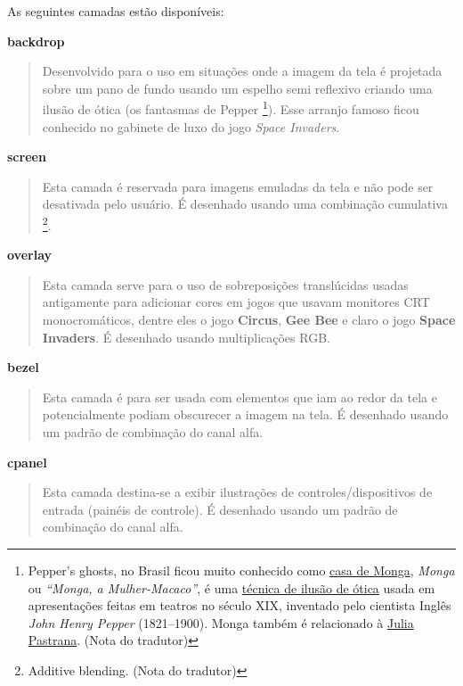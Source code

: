 \documentclass[letterpaper,10pt,brazil]{sphinxmanual}
\begin{document}
As seguintes camadas estão disponíveis:

\textbf{backdrop}
\begin{quote}

Desenvolvido para o uso em situações onde a imagem da tela é projetada
sobre um pano de fundo usando um espelho semi reflexivo criando uma
ilusão de ótica (os fantasmas de Pepper \footnote[5]{\sphinxAtStartFootnote%
Pepper's ghosts, no Brasil ficou muito
conhecido como \href{https://www.youtube.com/watch?v=L5Lgn1vbeHA}{casa de Monga},
\emph{Monga} ou \emph{``Monga, a Mulher-Macaco''}, é uma \href{https://www.youtube.com/watch?v=xrAWgmfhOaM}{técnica de ilusão
de ótica} usada
em apresentações feitas em teatros no século XIX, inventado pelo
cientista Inglês \emph{John Henry Pepper} (1821–1900). Monga também é
relacionado à
\href{https://super.abril.com.br/ciencia/monga-a-verdadeira-mulher-macaco/}{Julia Pastrana}. (Nota do tradutor)
}). Esse arranjo famoso
ficou conhecido no gabinete de luxo do jogo \emph{Space Invaders}.
\end{quote}

\textbf{screen}
\begin{quote}

Esta camada é reservada para imagens emuladas da tela e não pode ser
desativada pelo usuário. É desenhado usando uma combinação
cumulativa \footnote[6]{\sphinxAtStartFootnote%
Additive blending. (Nota do tradutor)
}.
\end{quote}

\textbf{overlay}
\begin{quote}

Esta camada serve para o uso de sobreposições translúcidas usadas
antigamente para adicionar cores em jogos que usavam monitores CRT
monocromáticos, dentre eles o jogo \textbf{Circus}, \textbf{Gee Bee} e claro
o jogo \textbf{Space Invaders}.
É desenhado usando multiplicações RGB.
\end{quote}

\textbf{bezel}
\begin{quote}

Esta camada é para ser usada com elementos que iam ao redor da tela
e potencialmente podiam obscurecer a imagem na tela.
É desenhado usando um padrão de combinação do canal alfa.
\end{quote}

\textbf{cpanel}
\begin{quote}

Esta camada destina-se a exibir ilustrações de controles/dispositivos
de entrada (painéis de controle).
É desenhado usando um padrão de combinação do canal alfa.
\end{quote}
\end{document}
